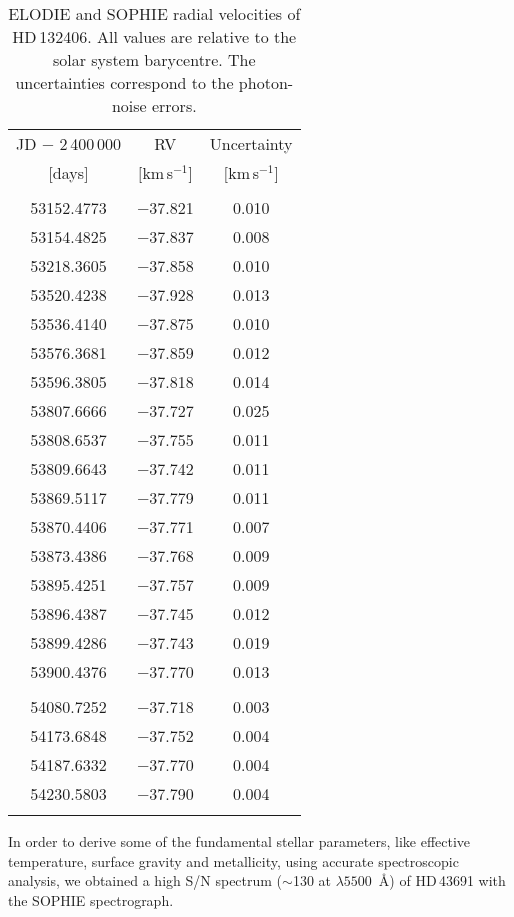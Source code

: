 \documentclass{aa}
\begin{document}
\begin{table}[t!]
\centering
  \caption[]{ELODIE and SOPHIE radial velocities of HD\,132406. All values
             are relative to the solar system barycentre. The uncertainties
	     correspond to the photon-noise errors.}
  \label{rad_vel2}
\begin{tabular}{ccc}
\hline
\hline
\noalign{\smallskip}
JD $-$ 2\,400\,000 & RV              & Uncertainty     \\
$[$days$]$         & $[$km\,s$^{-1}]$ & $[$km\,s$^{-1}]$ \\
\noalign{\smallskip}
\hline
\multicolumn{3}{c}{ELODIE measurements} \\
\hline
\noalign{\smallskip}
53152.4773 & $-$37.821 & 0.010 \\
53154.4825 & $-$37.837 & 0.008 \\
53218.3605 & $-$37.858 & 0.010 \\
53520.4238 & $-$37.928 & 0.013 \\
53536.4140 & $-$37.875 & 0.010 \\
53576.3681 & $-$37.859 & 0.012 \\
53596.3805 & $-$37.818 & 0.014 \\
53807.6666 & $-$37.727 & 0.025 \\
53808.6537 & $-$37.755 & 0.011 \\
53809.6643 & $-$37.742 & 0.011 \\
53869.5117 & $-$37.779 & 0.011 \\
53870.4406 & $-$37.771 & 0.007 \\
53873.4386 & $-$37.768 & 0.009 \\
53895.4251 & $-$37.757 & 0.009 \\
53896.4387 & $-$37.745 & 0.012 \\
53899.4286 & $-$37.743 & 0.019 \\
53900.4376 & $-$37.770 & 0.013 \\
\noalign{\smallskip}
\hline
\multicolumn{3}{c}{SOPHIE measurements} \\
\hline
\noalign{\smallskip}
54080.7252 & $-$37.718 & 0.003 \\
54173.6848 & $-$37.752 & 0.004 \\
54187.6332 & $-$37.770 & 0.004 \\
54230.5803 & $-$37.790 & 0.004 \\
\noalign{\smallskip}
\hline
\end{tabular}
\end{table}


In order to derive some of the fundamental stellar parameters, like
effective temperature, surface gravity and metallicity, using accurate
spectroscopic analysis, we obtained a high S/N spectrum ($\sim$130 at
$\lambda5500$~{\AA}) of HD\,43691 with the SOPHIE spectrograph.
\end{document}
